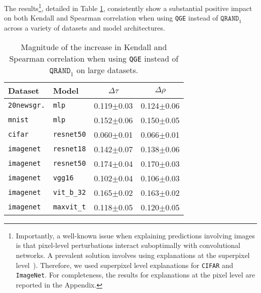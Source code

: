 
The results\footnote{Importantly, a well-known issue when explaining predictions involving images is that pixel-level perturbations interact suboptimally with convolutional networks. A prevalent solution involves using explanations at the superpixel level~\cite{blücher2024decoupling}). Therefore, we used superpixel level explanations for \texttt{CIFAR} and \texttt{ImageNet}. For completeness, the results for explanations at the pixel level are reported in the Appendix.}, detailed in Table \ref{tab:effects_per_model_and_dataset_chunky}, consistently show a substantial positive impact on both Kendall and Spearman correlation when using \texttt{QGE} instead of $\texttt{QRAND}_1$ across a variety of datasets and model architectures.

\begin{table}[!t]%
    \vskip 0.15in
    \begin{center}
    \begin{small}
    \begin{sc}
    \begin{tabular}{l|l|c|c}
        Dataset & Model & $\Delta \tau$ & $\Delta\rho$\\
        \toprule
        \texttt{20newsgr.} & \texttt{mlp} & 0.119$\pm$0.03 & 0.124$\pm$0.06\\
        \texttt{mnist} & \texttt{mlp} & 0.152$\pm$0.06 & 0.150$\pm$0.05\\
        \texttt{cifar} & \texttt{resnet50} & 0.060$\pm$0.01 & 0.066$\pm$0.01\\
        \texttt{imagenet} & \texttt{resnet18} & 0.142$\pm$0.07 & 0.138$\pm$0.06\\
        \texttt{imagenet} & \texttt{resnet50} & 0.174$\pm$0.04 & 0.170$\pm$0.03\\
        \texttt{imagenet} & \texttt{vgg16} & 0.102$\pm$0.04 & 0.106$\pm$0.03\\
        \texttt{imagenet} & \texttt{vit\_b\_32} & 0.165$\pm$0.02 & 0.163$\pm$0.02\\
        \texttt{imagenet} & \texttt{maxvit\_t} & 0.118$\pm$0.05 & 0.120$\pm$0.05\\
        \bottomrule
    \end{tabular}
    \end{sc}
    \end{small}
    \end{center}
    \caption{Magnitude of the increase in Kendall and Spearman correlation when using \texttt{QGE} instead of $\texttt{QRAND}_1$ on large datasets.}\label{tab:effects_per_model_and_dataset_chunky}
\end{table}

